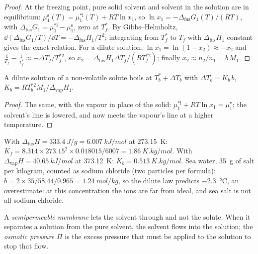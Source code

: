 \begin{proof}
At the freezing point, pure solid solvent and solvent in the solution are in
equilibrium: $\mu_1^{\text{s}}(T) = \mu_1^{*\text{l}}(T) + RT\ln x_1$, so
$\ln x_1 = -\Delta_{\text{fus}}G_1(T)/(RT)$, with $\Delta_{\text{fus}}G_1 =
\mu_1^{*\text{l}} - \mu_1^{\text{s}}$, zero at $T_f^*$. By Gibbs--Helmholtz,
$\dd(\Delta_{\text{fus}}G_1/T)/\dd T = -\Delta_{\text{fus}}H_1/T^2$;
integrating from $T_f^*$ to $T_f$ with $\Delta_{\text{fus}}H_1$ constant gives
the exact relation. For a dilute solution, $\ln x_1 = \ln(1 - x_2) \approx
-x_2$ and $\frac1{T_f} - \frac1{T_f^*} \approx -\Delta T_f/T_f^{*2}$, so
$x_2 = \Delta_{\text{fus}}H_1\Delta T_f/(RT_f^{*2})$; finally $x_2 \approx
n_2/n_1 = b\,M_1$.
\end{proof}

\begin{proposition}\label{prop:b2:chemical-potential:ebullioscopy}
A dilute solution of a non-volatile solute boils at $T_b^* + \Delta T_b$ with
$\Delta T_b = K_b\,b$, $K_b = RT_b^{*2}M_1/\Delta_{\text{vap}}H_1$.
\end{proposition}

\begin{proof}
The same, with the vapour in place of the solid: $\mu_1^{*\text{l}} +
RT\ln x_1 = \mu_1^{\text{v}}$; the solvent's line is lowered, and now meets the
vapour's line at a higher temperature.
\end{proof}

\begin{example}[Water]\label{ex:b2:chemical-potential:water-constants}
With $\Delta_{\text{fus}}H = \qty{333.4}{J/g} = \qty{6.007}{kJ/mol}$ at
\qty{273.15}{K}: $K_f = 8.314 \times 273.15^2 \times 0.018015/6007 =
\qty{1.86}{K.kg/mol}$. With $\Delta_{\text{vap}}H = \qty{40.65}{kJ/mol}$ at
\qty{373.12}{K}: $K_b = \qty{0.513}{K.kg/mol}$. Sea water, \qty{35}{g} of salt
per kilogram, counted as sodium chloride (two particles per formula):
$b = 2 \times 35/58.44/0.965 = \qty{1.24}{mol/kg}$, so the dilute law
predicts \qty{-2.3}{\celsius}, an overestimate: at this concentration the
ions are far from ideal, and sea salt is not all sodium chloride.
\end{example}

\begin{definition}\label{def:b2:chemical-potential:osmotic-pressure}
A \emph{semipermeable membrane} lets the
solvent through and not the solute. When it separates a solution from the
pure solvent, the solvent flows into the solution; the \emph{osmotic
pressure} $\Pi$ is the excess pressure that must be
applied to the solution to stop that flow.
\end{definition}

